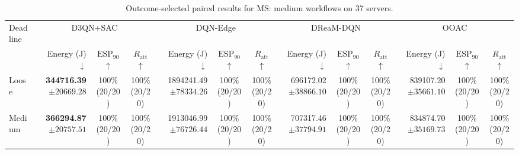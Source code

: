 \documentclass[10pt]{article}
\begin{document}
\begin{table}[!htbp]
\centering
\caption{Outcome-selected paired results for MS: medium workflows on 37 servers.}
\label{tab:conditional_case_ms}
\begingroup
\footnotesize
\setlength{\tabcolsep}{2.2pt}
\renewcommand{\arraystretch}{1.08}
\begin{tabular}{@{}l*{4}{rcc}@{}}
\toprule
Deadline & \multicolumn{3}{c}{D3QN+SAC} & \multicolumn{3}{c}{DQN-Edge} & \multicolumn{3}{c}{DReaM-DQN} & \multicolumn{3}{c}{OOAC} \\
\cmidrule(lr){2-4}\cmidrule(lr){5-7}\cmidrule(lr){8-10}\cmidrule(lr){11-13}
 & Energy (J) $\downarrow$ & $\mathrm{ESP}_{90}$ $\uparrow$ & $R_{\mathrm{att}}$ $\uparrow$ & Energy (J) $\downarrow$ & $\mathrm{ESP}_{90}$ $\uparrow$ & $R_{\mathrm{att}}$ $\uparrow$ & Energy (J) $\downarrow$ & $\mathrm{ESP}_{90}$ $\uparrow$ & $R_{\mathrm{att}}$ $\uparrow$ & Energy (J) $\downarrow$ & $\mathrm{ESP}_{90}$ $\uparrow$ & $R_{\mathrm{att}}$ $\uparrow$ \\
\midrule
Loose & \shortstack[r]{\textbf{344716.39}\\$\pm 20669.28$} & \shortstack[c]{100\%\\(20/20)} & \shortstack[c]{100\%\\(20/20)} & \shortstack[r]{1894241.49\\$\pm 78334.26$} & \shortstack[c]{100\%\\(20/20)} & \shortstack[c]{100\%\\(20/20)} & \shortstack[r]{696172.02\\$\pm 38866.10$} & \shortstack[c]{100\%\\(20/20)} & \shortstack[c]{100\%\\(20/20)} & \shortstack[r]{839107.20\\$\pm 35661.10$} & \shortstack[c]{100\%\\(20/20)} & \shortstack[c]{100\%\\(20/20)} \\
Medium & \shortstack[r]{\textbf{366294.87}\\$\pm 20757.51$} & \shortstack[c]{100\%\\(20/20)} & \shortstack[c]{100\%\\(20/20)} & \shortstack[r]{1913046.99\\$\pm 76726.44$} & \shortstack[c]{100\%\\(20/20)} & \shortstack[c]{100\%\\(20/20)} & \shortstack[r]{707317.46\\$\pm 37794.91$} & \shortstack[c]{100\%\\(20/20)} & \shortstack[c]{100\%\\(20/20)} & \shortstack[r]{834874.70\\$\pm 35169.73$} & \shortstack[c]{100\%\\(20/20)} & \shortstack[c]{100\%\\(20/20)} \\

\end{tabular}
\end{table}
\end{document}
